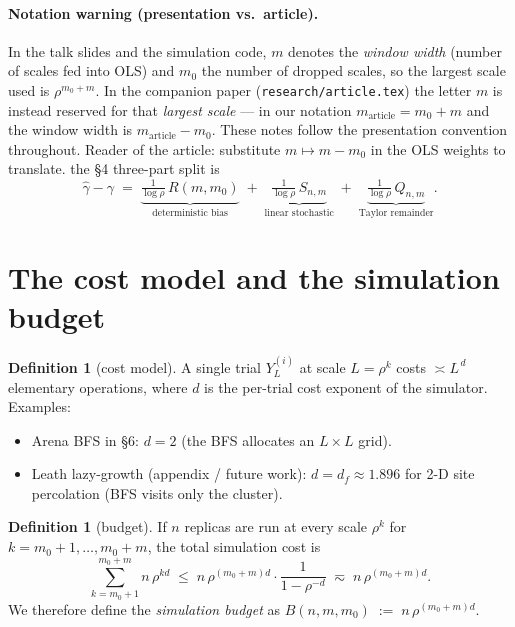 \documentclass[11pt]{article}
\theoremstyle{plain}
\theoremstyle{definition}
\newtheorem{definition}[theorem]{Definition}
\begin{document}
\paragraph{Notation warning (presentation vs.\ article).}
In the talk slides and the simulation code, $m$ denotes the
\emph{window width} (number of scales fed into OLS) and $m_0$ the
number of dropped scales, so the largest scale used is $\rho^{m_0+m}$.
In the companion paper (\texttt{research/article.tex}) the letter $m$
is instead reserved for that \emph{largest scale} --- in our notation
$m_{\text{article}} = m_0 + m$ and the window width is
$m_{\text{article}} - m_0$. These notes follow the presentation
convention throughout. Reader of the article: substitute
$m \mapsto m - m_0$ in the OLS weights to translate. the §4 three-part split is
\begin{equation}\label{eq:split}
  \hat\gamma - \gamma
  \;=\;
  \underbrace{\tfrac{1}{\log\rho}\,R(m,m_0)}_{\text{deterministic bias}}
  \;+\;
  \underbrace{\tfrac{1}{\log\rho}\,S_{n,m}}_{\text{linear stochastic}}
  \;+\;
  \underbrace{\tfrac{1}{\log\rho}\,Q_{n,m}}_{\text{Taylor remainder}}.
\end{equation}

\section{The cost model and the simulation budget}\label{sec:budget}

\begin{definition}[cost model]
A single trial $Y_L^{(i)}$ at scale $L = \rho^{k}$ costs
$\asymp L^{\,d}$ elementary operations, where $d$ is the per-trial
cost exponent of the simulator. Examples:
\begin{itemize}
  \item Arena BFS in §6: $d = 2$ (the BFS allocates an $L\times L$ grid).
  \item Leath lazy-growth (appendix / future work): $d = d_f \approx 1.896$
        for 2-D site percolation (BFS visits only the cluster).
\end{itemize}
\end{definition}

\begin{definition}[budget]\label{def:budget}
If $n$ replicas are run at every scale $\rho^{k}$ for $k=m_0+1,\dots,m_0+m$,
the total simulation cost is
\[
  \sum_{k=m_0+1}^{m_0+m} n\,\rho^{kd}
  \;\le\; n\,\rho^{(m_0+m)d}\cdot\frac{1}{1-\rho^{-d}}
  \;\eqsim\; n\,\rho^{(m_0+m)d}.
\]
We therefore define the \emph{simulation budget} as
\(
  B(n, m, m_0) \;:=\; n\,\rho^{(m_0+m)d}.
\)
\end{definition}
\end{document}

